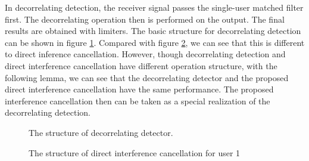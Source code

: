 \documentclass[a4paper,12pt,fleqn]{article}
\begin{document}
In decorrelating detection, the receiver signal passes the
single-user matched filter first. The decorrelating operation then
is performed on the output. The final results are obtained with
limiters. The basic structure for decorrelating detection can be
shown in figure \ref{DD_block}. Compared with figure
\ref{DirectIC_block}, we can see that this is different to direct
inference cancellation. However, though decorrelating detection
and direct interference cancellation have different operation
structure, with the following lemma, we can see that the
decorrelating detector and the proposed direct interference
cancellation have the same performance. The proposed interference
cancellation then can be taken as a special realization of the
decorrelating detection.

\begin{figure}
\caption{The structure of decorrelating detector.}
\label{DD_block}
\end{figure}

\begin{figure}
\caption{The structure of direct interference cancellation for
user 1} \label{DirectIC_block}
\end{figure}
\end{document}
